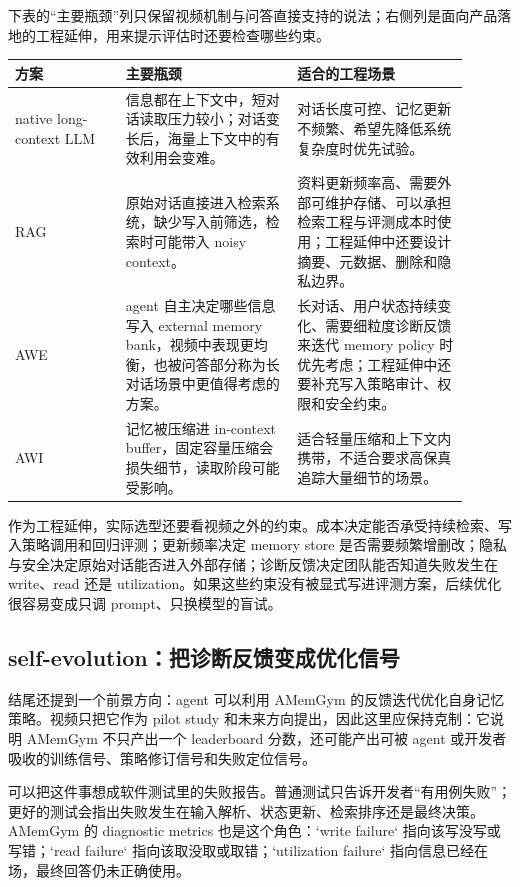 下表的“主要瓶颈”列只保留视频机制与问答直接支持的说法；右侧列是面向产品落地的工程延伸，用来提示评估时还要检查哪些约束。

\begin{center}
\begin{tabular}{p{0.22\linewidth}p{0.34\linewidth}p{0.34\linewidth}}
\toprule
\textbf{方案} & \textbf{主要瓶颈} & \textbf{适合的工程场景} \\
\midrule
native long-context LLM & 信息都在上下文中，短对话读取压力较小；对话变长后，海量上下文中的有效利用会变难。 & 对话长度可控、记忆更新不频繁、希望先降低系统复杂度时优先试验。 \\
RAG & 原始对话直接进入检索系统，缺少写入前筛选，检索时可能带入 noisy context。 & 资料更新频率高、需要外部可维护存储、可以承担检索工程与评测成本时使用；工程延伸中还要设计摘要、元数据、删除和隐私边界。 \\
AWE & agent 自主决定哪些信息写入 external memory bank，视频中表现更均衡，也被问答部分称为长对话场景中更值得考虑的方案。 & 长对话、用户状态持续变化、需要细粒度诊断反馈来迭代 memory policy 时优先考虑；工程延伸中还要补充写入策略审计、权限和安全约束。 \\
AWI & 记忆被压缩进 in-context buffer，固定容量压缩会损失细节，读取阶段可能受影响。 & 适合轻量压缩和上下文内携带，不适合要求高保真追踪大量细节的场景。 \\
\bottomrule
\end{tabular}
\end{center}

作为工程延伸，实际选型还要看视频之外的约束。成本决定能否承受持续检索、写入策略调用和回归评测；更新频率决定 memory store 是否需要频繁增删改；隐私与安全决定原始对话能否进入外部存储；诊断反馈决定团队能否知道失败发生在 write、read 还是 utilization。如果这些约束没有被显式写进评测方案，后续优化很容易变成只调 prompt、只换模型的盲试。

\subsection{self-evolution：把诊断反馈变成优化信号}

结尾还提到一个前景方向：agent 可以利用 AMemGym 的反馈迭代优化自身记忆策略。视频只把它作为 pilot study 和未来方向提出，因此这里应保持克制：它说明 AMemGym 不只产出一个 leaderboard 分数，还可能产出可被 agent 或开发者吸收的训练信号、策略修订信号和失败定位信号。

可以把这件事想成软件测试里的失败报告。普通测试只告诉开发者“有用例失败”；更好的测试会指出失败发生在输入解析、状态更新、检索排序还是最终决策。AMemGym 的 diagnostic metrics 也是这个角色：`write failure` 指向该写没写或写错；`read failure` 指向该取没取或取错；`utilization failure` 指向信息已经在场，最终回答仍未正确使用。

